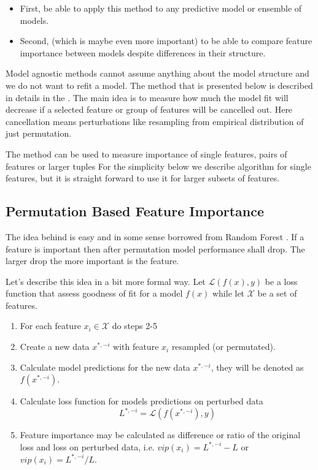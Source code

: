 \documentclass[12pt,]{krantz}
\providecommand{\tightlist}{%
  \setlength{\itemsep}{0pt}\setlength{\parskip}{0pt}}
\theoremstyle{definition}
\theoremstyle{definition}
\theoremstyle{definition}
\theoremstyle{remark}
\begin{document}
\begin{itemize}
\tightlist
\item
  First, be able to apply this method to any predictive model or
  ensemble of models.
\item
  Second, (which is maybe even more important) to be able to compare
  feature importance between models despite differences in their
  structure.
\end{itemize}

Model agnostic methods cannot assume anything about the model structure
and we do not want to refit a model. The method that is presented below
is described in details in the \citep{variableImportancePermutations}.
The main idea is to measure how much the model fit will decrease if a
selected feature or group of features will be cancelled out. Here
cancellation means perturbations like resampling from empirical
distribution of just permutation.

The method can be used to measure importance of single features, pairs
of features or larger tuples For the simplicity below we describe
algorithm for single features, but it is straight forward to use it for
larger subsets of features.

\hypertarget{permutation-based-feature-importance}{%
\subsection{Permutation Based Feature
Importance}\label{permutation-based-feature-importance}}

The idea behind is easy and in some sense borrowed from Random Forest
\citep{R-randomForest}. If a feature is important then after permutation
model performance shall drop. The larger drop the more important is the
feature.

Let's describe this idea in a bit more formal way. Let
\(\mathcal L(f(x), y)\) be a loss function that assess goodness of fit
for a model \(f(x)\) while let \(\mathcal X\) be a set of features.

\begin{enumerate}
\def\labelenumi{\arabic{enumi}.}
\tightlist
\item
  For each feature \(x_i \in \mathcal X\) do steps 2-5
\item
  Create a new data \(x^{*,-i}\) with feature \(x_i\) resampled (or
  permutated).
\item
  Calculate model predictions for the new data \(x^{*,-i}\), they will
  be denoted as \(f(x^{*,-i})\).
\item
  Calculate loss function for models predictions on perturbed data \[
  L^{*,-i} = \mathcal L(f(x^{*,-i}), y)
  \]
\item
  Feature importance may be calculated as difference or ratio of the
  original loss and loss on perturbed data, i.e.
  \(vip(x_i) = L^{*,-i} - L\) or \(vip(x_i) = L^{*,-i} / L\).
\end{enumerate}
\end{document}
